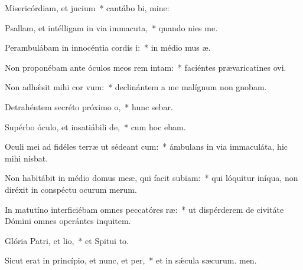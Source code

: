 \item Misericórdiam, et jucium~* cantábo bi, mine:
\item Psallam, et intélligam in via immacuta,~* quando nies  me.
\item Perambulábam in innocéntia cordis i:~* in médio mus æ.
\item Non proponébam ante óculos meos rem intam:~* faciéntes prævaricatines ovi.
\item Non adhǽsit mihi cor vum:~* declinántem a me malígnum non gnobam.
\item Detrahéntem secréto próximo o,~* hunc sebar.
\item Supérbo óculo, et insatiábili de,~* cum hoc  ebam.
\item Oculi mei ad fidéles terræ ut sédeant cum:~* ámbulans in via immaculáta, hic mihi nisbat.
\item Non habitábit in médio domus meæ, qui facit subiam:~* qui lóquitur iníqua, non diréxit in conspéctu ocurum merum.
\item In matutíno interficiébam omnes peccatóres ræ:~* ut dispérderem de civitáte Dómini omnes operántes inquitem.
\item Glória Patri, et lio,~* et Spitui to.
\item Sicut erat in princípio, et nunc, et per,~* et in sǽcula sæcurum. men.
